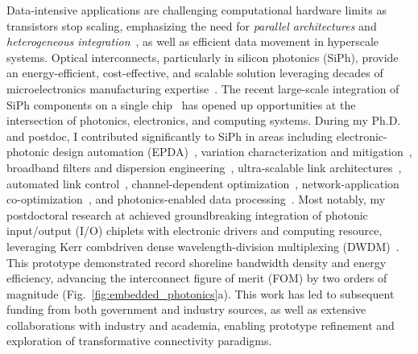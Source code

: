 Data-intensive applications are challenging computational hardware limits as transistors stop scaling, emphasizing the need for \emph{parallel architectures} and \emph{heterogeneous integration}~\cite{iyerHeterogeneousIntegrationPerformance2016}, as well as efficient data movement in hyperscale systems. Optical interconnects, particularly in silicon photonics (SiPh), provide an energy-efficient, cost-effective, and scalable solution leveraging decades of microelectronics manufacturing expertise~\cite{millerRationaleChallengesOptical2000,sorefPresentFutureSilicon2006}. The recent large-scale integration of SiPh components on a single chip~\cite{shekharRoadmappingNextGeneration2024} has opened up opportunities at the intersection of photonics, electronics, and computing systems. During my Ph.D. and postdoc, I contributed significantly to SiPh in areas including electronic-photonic design automation (EPDA)~\cite{wuCompactModelingCircuitlevel2017,zhangCompactModelingSilicon2017,jamesFlexibleProcessAwareCompact2022,jamesProcessVariationAwareCompact2023a}, variation characterization and mitigation~\cite{wuPairingMicroringbasedSilicon2018,wangEnergyefficientChannelAlignment2018,wangTamingEmergingDevices2019,wangBidirectionalTuningMicroringbased2019,wangCharacterizationApplicationsSpatial2020,wangEnergyEfficiencyYield2021}, broadband filters and dispersion engineering~\cite{wangDispersionEngineeredFabricationRobustSOI2023,wangIntegratedCompactTunable2023,parsonsOFC25}, ultra-scalable link architectures~\cite{wangScalableArchitectureSubpJ2023,novickHighbandwidthDensitySilicon2023}, automated link control~\cite{wangAutomatedTuningRingAssisted2024,wangInterleaverTuning,wangOFC25}, channel-dependent optimization~\cite{novickIntegratedPhotonicResonant2024,gopalEqualization2024}, network-application co-optimization~\cite{wangTaskMappingAssistedLaser2019,wangTrafficAdaptivePowerReconfiguration2021,michelogiannakisEfficientIntraRackResource2023,wuWavelengthReconfigurableTransceiver2024,wuFlexibleSiliconPhotonic2024}, and photonics-enabled data processing~\cite{naumanOFC25,zypmanDSP}. Most notably, my postdoctoral research at \mySchoolShort{} achieved groundbreaking integration of photonic input/output (I/O) chiplets with electronic drivers and computing resource, leveraging Kerr comb\textendash{}driven dense wavelength-division multiplexing (DWDM)~\cite{wangSiliconPhotonicsChip2024,wangCoDesignedSiliconPhotonics2024,RovinskiISCAS25}. This prototype demonstrated record shoreline bandwidth density and energy efficiency, advancing the interconnect figure of merit (FOM) by two orders of magnitude (Fig.~\ref{fig:embedded_photonics}a). This work has led to subsequent funding from both government and industry sources, as well as extensive collaborations with industry and academia, enabling prototype refinement and exploration of transformative connectivity paradigms.

